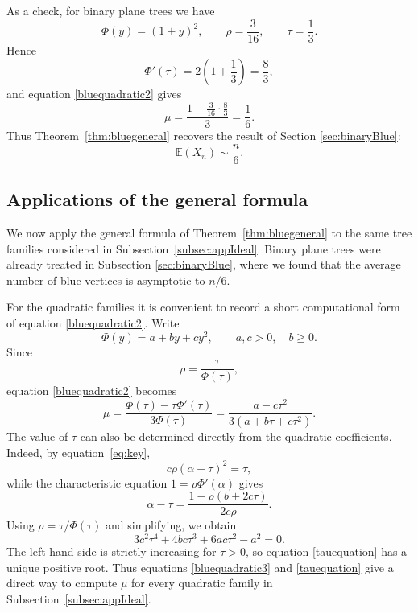 \documentclass[11pt, onesided]{amsart}
\theoremstyle{remark}
\begin{document}
As a check, for binary plane trees we have
\[
\Phi(y)=(1+y)^2,
\qquad
\rho=\frac{3}{16},
\qquad
\tau=\frac13.
\]
Hence
\[
\Phi'(\tau)=2\left(1+\frac13\right)=\frac83,
\]
and equation \eqref{bluequadratic2} gives
\[
\mu
=
\frac{1-\frac{3}{16}\cdot\frac83}{3}
=
\frac16.
\]
Thus Theorem~\ref{thm:bluegeneral} recovers the result of Section \ref{sec:binaryBlue}:
\[
\mathbb E(X_n)\sim\frac{n}{6}.
\]


\subsection{Applications of the general formula}

We now apply the general formula of Theorem~\ref{thm:bluegeneral} to the
same tree families considered in Subsection~\ref{subsec:appIdeal}.  Binary plane trees were
already treated in Subsection \ref{sec:binaryBlue}, where we found that the average number of
blue vertices is asymptotic to $n/6$.

For the quadratic families it is convenient to record a short computational
form of equation \eqref{bluequadratic2}.  Write
\[
\Phi(y)=a+by+cy^2,
\qquad a,c>0,\quad b\geq 0.
\]
Since
\[
\rho=\frac{\tau}{\Phi(\tau)},
\]
equation \eqref{bluequadratic2} becomes
\begin{equation}\label{bluequadratic3}
\mu
=
\frac{\Phi(\tau)-\tau\Phi'(\tau)}{3\Phi(\tau)}
=
\frac{a-c\tau^2}{3(a+b\tau+c\tau^2)}.
\end{equation}
The value of $\tau$ can also be determined directly from the quadratic
coefficients.  Indeed, by equation~\eqref{eq:key},
\[
c\rho(\alpha-\tau)^2=\tau,
\]
while the characteristic equation $1=\rho\Phi'(\alpha)$ gives
\[
\alpha-\tau
=
\frac{1-\rho(b+2c\tau)}{2c\rho}.
\]
Using $\rho=\tau/\Phi(\tau)$ and simplifying, we obtain
\begin{equation}\label{tauequation}
3c^2\tau^4+4bc\tau^3+6ac\tau^2-a^2=0.
\end{equation}
The left-hand side is strictly increasing for $\tau>0$, so
equation \eqref{tauequation} has a unique positive root.  Thus
equations \eqref{bluequadratic3} and \eqref{tauequation} give a direct way to compute
$\mu$ for every quadratic family in Subsection~\ref{subsec:appIdeal}.
\end{document}
